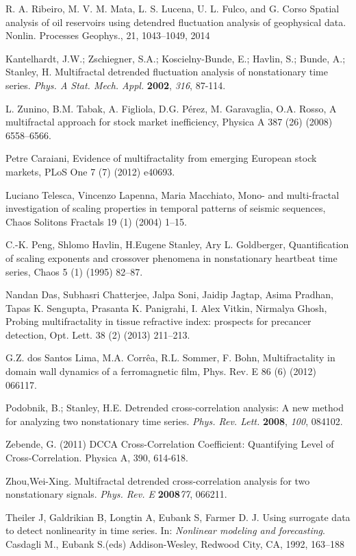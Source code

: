\documentclass[onecolumn, preprint,aps,amsmath, amssymb, superscriptaddress]{revtex4}
\begin{document}
\begin{thebibliography}{99}
R. A. Ribeiro, M. V. M. Mata, L. S. Lucena, U. L. Fulco, and G. Corso
Spatial analysis of oil reservoirs using detendred fluctuation analysis of geophysical data.
Nonlin. Processes Geophys., 21, 1043–1049, 2014

Kantelhardt, J.W.; Zschiegner, S.A.; Koscielny-Bunde, E.; Havlin, S.; Bunde, A.; Stanley, H. Multifractal detrended fluctuation analysis of nonstationary time series. {\em Phys. A Stat. Mech. Appl.} {\bf 2002}, {\em 316}, 87-114.

 L. Zunino, B.M. Tabak, A. Figliola, D.G. Pérez, M. Garavaglia, O.A. Rosso, A multifractal approach for stock market inefficiency, Physica A 387 (26) (2008)
6558–6566.

 Petre Caraiani, Evidence of multifractality from emerging European stock markets, PLoS One 7 (7) (2012) e40693.

 Luciano Telesca, Vincenzo Lapenna, Maria Macchiato, Mono- and multi-fractal investigation of scaling properties in temporal patterns of seismic
sequences, Chaos Solitons Fractals 19 (1) (2004) 1–15.

C.-K. Peng, Shlomo Havlin, H.Eugene Stanley, Ary L. Goldberger, Quantification of scaling exponents and crossover phenomena in nonstationary heartbeat time series, Chaos 5 (1) (1995) 82–87.

 Nandan Das, Subhasri Chatterjee, Jalpa Soni, Jaidip Jagtap, Asima Pradhan, Tapas K. Sengupta, Prasanta K. Panigrahi, I. Alex Vitkin, Nirmalya Ghosh,
Probing multifractality in tissue refractive index: prospects for precancer detection, Opt. Lett. 38 (2) (2013) 211–213.

 G.Z. dos Santos Lima, M.A. Corrêa, R.L. Sommer, F. Bohn, Multifractality in domain wall dynamics of a ferromagnetic film, Phys. Rev. E 86 (6) (2012)
066117.

 Podobnik, B.; Stanley, H.E. Detrended cross-correlation analysis: A new method for analyzing two nonstationary time series. {\em Phys. Rev. Lett.} {\bf 2008}, {\em 100}, 084102.

 Zebende, G. (2011) DCCA Cross-Correlation Coefficient: Quantifying Level of Cross-Correlation. Physica A, 390, 614-618.

 Zhou,Wei-Xing. Multifractal detrended cross-correlation analysis for two nonstationary signals. {\em Phys. Rev. E} {\bf 2008}{\em 77}, 066211.

Theiler J, Galdrikian B, Longtin A, Eubank S, Farmer D. J. Using surrogate data to detect nonlinearity in time series. In: {\em Nonlinear modeling and forecasting}. Casdagli M., Eubank S.(eds) Addison-Wesley, Redwood City, CA, 1992, 163--188

\end{thebibliography}
\end{document}
